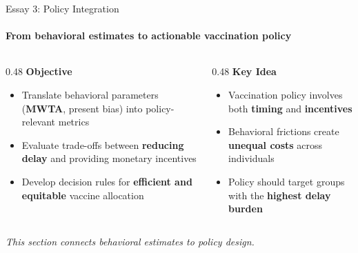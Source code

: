 \begin{frame}{Essay 3: Policy Integration}
    \framesubtitle{From behavioral estimates to actionable vaccination policy}
    
    \begin{columns}[T]
        \begin{column}{0.48\textwidth}
            \textbf{Objective}
            \begin{itemize}
                \item Translate behavioral parameters (\textbf{MWTA}, present bias) into policy-relevant metrics
                \item Evaluate trade-offs between \textbf{reducing delay} and providing monetary incentives
                \item Develop decision rules for \textbf{efficient and equitable} vaccine allocation
            \end{itemize}
        \end{column}
        
        \hfill
        
        \begin{column}{0.48\textwidth}
            \textbf{Key Idea}
            \begin{itemize}
                \item Vaccination policy involves both \textbf{timing} and \textbf{incentives}
                \item Behavioral frictions create \textbf{unequal costs} across individuals
                \item Policy should target groups with the \textbf{highest delay burden}
            \end{itemize}
        \end{column}
    \end{columns}
    
    \vspace{1.5em}
    \begin{center}
        \textit{This section connects behavioral estimates to policy design.}
    \end{center}
\end{frame}
